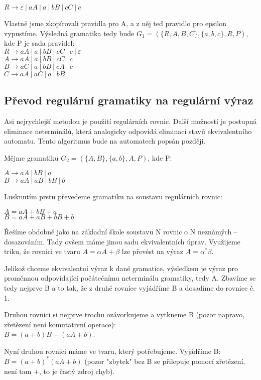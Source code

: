 \documentclass{article}
\begin{document}
$R \rightarrow \varepsilon ~ | ~aA ~ | ~a~ | ~bB~ | ~cC~ | ~c~$

Vlastně jsme zkopírovali pravidla pro A, a z něj teď pravidlo pro epsilon vypustíme. Výsledná gramatika tedy bude 
$G_1 = (\{R,A,B,C\}, \{a,b,c\}, R, P)$, kde P je sada pravidel:\\
$R \rightarrow aA ~ | ~a~ | ~bB~ | ~cC~ | ~c~ | ~ \varepsilon$\\
$A \rightarrow aA ~ | ~a~ | ~bB~ | ~cC~ | ~c~$\\
$B \rightarrow aC ~ | ~a~ | ~bB~ | ~cA~ | ~c$\\
$C \rightarrow aA~ | ~aC~ |~a~ | ~ bB $

\subsection{Převod regulární gramatiky na regulární výraz}

Asi nejrychlejší metodou je použití regulárních rovnic. Další možností je postupná eliminace neterminálů, která analogicky odpovídá eliminaci stavů ekvivalentního automatu. Tento algoritmus bude na automatech popsán později.

Mějme gramatiku $G_2 = (\{A,B\}, \{a,b\}, A, P)$, kde P:

\noindent
$A \rightarrow aA ~|~ bB ~|~ a$\\
$B \rightarrow aA ~|~ aB ~|~  bB ~|~ b$

Lusknutím prstu převedeme gramatiku na soustavu regulárních rovnic:

\noindent
$A = aA + bB + a$\\
$B = aA + aB + bB + b$

Řešíme obdobně jako na základní škole soustavu N rovnic o N neznámých -- dosazováním.
Tady ovšem máme jinou sadu ekvivalentních úprav. Využijeme triku, že rovnici ve tvaru 
$A = \alpha A + \beta$ lze převést na výraz $A = \alpha ^* \beta$.

Jelikož chceme ekvivalentní výraz k dané gramatice, výsledkem je výraz pro proměnnou odpovídající počátečnímu neterminálu gramatiky, tedy A.
Zbavíme se tedy nejprve B a to tak, že z druhé rovnice vyjádříme B a dosadíme do rovnice č. 1.

Druhou rovnici si nejprve trochu ozávorkujeme a vytkneme B (pozor napravo, zřetězení není komutativní operace):\\
$B = (a + b)B + (aA + b)$.

Nyní druhou rovnici máme ve tvaru, který potřebujeme. Vyjádříme B:\\
$B = (a + b)^* (aA + b)$ (pozor "zbytek" bez B se přilepuje pomocí zřetězení, není tam +, to je častý zdroj chyb).
\end{document}
